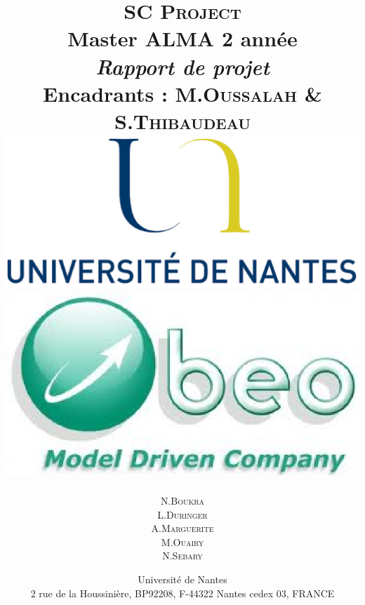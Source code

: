 \documentclass{report}
\title{ {\huge \textsc{SC Project}} \\Master ALMA 2\up{eme} année \\\vspace{1cm} \emph{Rapport de projet} \\ {\small Encadrants : M.\textsc{Oussalah} \& S.\textsc{Thibaudeau}} \\\vspace{2cm}\includegraphics[scale=0.17]{img/logouniv} \hspace{1cm}\includegraphics[scale=0.35]{img/logoobeo}\vspace{1.5cm}}
\author{N.\textsc{Boukra} \\ L.\textsc{Duringer} \\  A.\textsc{Marguerite}\\ M.\textsc{Ouairy}\\ N.\textsc{Sebary} \\  \vspace{1cm}}
\date{Université de Nantes \\ 2 rue de la Houssinière, BP92208, F-44322 Nantes cedex 03, FRANCE}
\newcommand{\inputnp}[1]{\newpage}
\begin{document}
\maketitle
\renewcommand{\labelitemi}{$\bullet$} 

\clearpage

\tableofcontents
\clearpage


\inputnp{1_Introduction}
\inputnp{2_Objectifs}
\inputnp{3_Methodologie} 
\inputnp{4_Travaux}
\inputnp{5_Bilan}


\listoffigures


   
\end{document}
